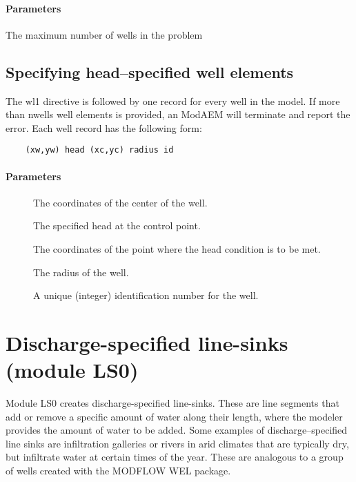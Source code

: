 \paragraph{Parameters}

 The maximum number of wells in the problem \units{-}

\subsection{Specifying head--specified well elements}

The \textsf{wl1} directive is followed by one record for every well in the model. If more than nwells well elements is provided, an ModAEM will terminate and report the error. Each well record has the following form:
\begin{verbatim}
    (xw,yw) head (xc,yc) radius id
\end{verbatim}

\paragraph{Parameters}

\begin{description}
\item [] The coordinates of the center of the well. 
\item [] The specified head at the control point. 
\item [] The coordinates of the point where the head
condition is to be met. 
\item [] The radius of the well. 
\item [] A unique (integer) identification number for the
well. \units{-}
\end{description}
\newpage


\section{Discharge-specified line-sinks (module LS0) \label{sec:ls0-module}}

Module LS0 creates discharge-specified line-sinks. These are line
segments that add or remove a specific amount of water along their
length, where the modeler provides the amount of water to be added.
Some examples of discharge--specified line sinks are infiltration
galleries or rivers in arid climates that are typically dry, but infiltrate
water at certain times of the year. These are analogous to a group
of wells created with the MODFLOW WEL package.

